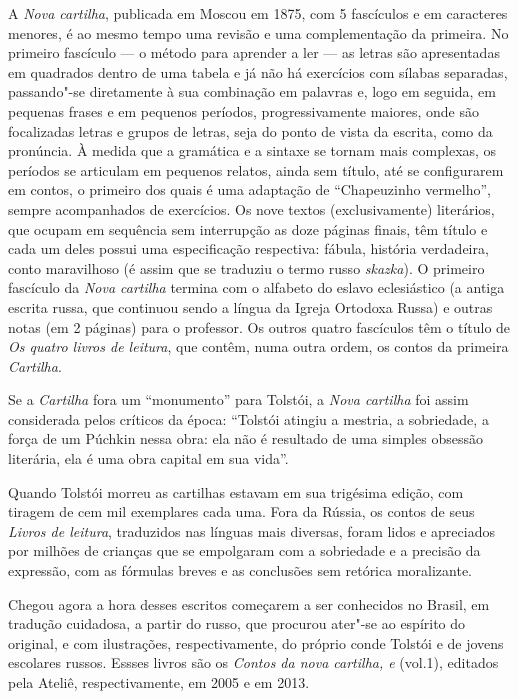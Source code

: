 A \emph{Nova cartilha}, publicada em Moscou em 1875, com 5 fascículos e
em caracteres menores, é ao mesmo tempo uma revisão e uma complementação
da primeira. No primeiro fascículo --- o método para aprender a ler --- as
letras são apresentadas em quadrados dentro de uma tabela e já não há
exercícios com sílabas separadas, passando"-se diretamente à sua
combinação em palavras e, logo em seguida, em pequenas frases e em
pequenos períodos, progressivamente maiores, onde são focalizadas letras
e grupos de letras, seja do ponto de vista da escrita, como da
pronúncia. À medida que a gramática e a sintaxe se tornam mais
complexas, os períodos se articulam em pequenos relatos, ainda sem
título, até se configurarem em contos, o primeiro dos quais é uma
adaptação de ``Chapeuzinho vermelho'', sempre acompanhados de
exercícios. Os nove textos (exclusivamente) literários, que ocupam em
sequência sem interrupção as doze páginas finais, têm título e cada um
deles possui uma especificação respectiva: fábula, história verdadeira,
conto maravilhoso (é assim que se traduziu o termo
russo \emph{skazka}). O primeiro fascículo da \emph{Nova
cartilha} termina com o alfabeto do eslavo eclesiástico (a antiga
escrita russa, que continuou sendo a língua da Igreja Ortodoxa Russa) e
outras notas (em 2 páginas) para o professor. Os outros quatro
fascículos têm o título de \emph{Os quatro livros de leitura}, que
contêm, numa outra ordem, os contos da primeira \emph{Cartilha}.

Se a \emph{Cartilha} fora um ``monumento'' para Tolstói, a \emph{Nova
cartilha} foi assim considerada pelos críticos da época: ``Tolstói
atingiu a mestria, a sobriedade, a força de um Púchkin nessa obra: ela
não é resultado de uma simples obsessão literária, ela é uma obra
capital em sua vida''.

Quando Tolstói morreu as cartilhas estavam em sua trigésima edição, com
tiragem de cem mil exemplares cada uma. Fora da Rússia, os contos de
seus \emph{Livros de leitura}, traduzidos nas línguas mais diversas,
foram lidos e apreciados por milhões de crianças que se empolgaram com a
sobriedade e a precisão da expressão, com as fórmulas breves e as
conclusões sem retórica moralizante.

Chegou agora a hora desses escritos começarem a ser conhecidos no Brasil,
em tradução cuidadosa, a partir do russo, que procurou ater"-se ao
espírito do original, e com ilustrações, respectivamente, do próprio
conde Tolstói e de jovens escolares russos. Essses livros são os
\emph{Contos da nova cartilha,  e } (vol.1), editados pela Ateliê,
respectivamente, em 2005 e em 2013.



